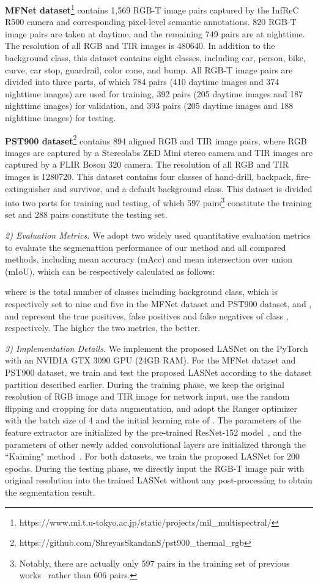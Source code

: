 \documentclass[journal]{IEEEtran}
\begin{document}
\textbf{MFNet dataset}\footnote{https://www.mi.t.u-tokyo.ac.jp/static/projects/mil\_multispectral/} contains 1,569 RGB-T image pairs captured by the InfReC R500 camera and corresponding pixel-level semantic annotations. 
820 RGB-T image pairs are taken at daytime, and the remaining 749 pairs are at nighttime.
The resolution of all RGB and TIR images is 480640.
In addition to the background class, this dataset contains eight classes, including car, person, bike, curve, car stop, guardrail, color cone, and bump.
All RGB-T image pairs are divided into three parts, of which 784 pairs (410 daytime images and 374 nighttime images) are used for training, 392 pairs (205 daytime images and 187 nighttime images) for validation, and 393 pairs (205 daytime images and 188 nighttime images) for testing.

\textbf{PST900 dataset}\footnote{https://github.com/ShreyasSkandanS/pst900\_thermal\_rgb} contains 894 aligned RGB and TIR image pairs, where RGB images are captured by a Stereolabs ZED Mini stereo camera and TIR images are captured by a FLIR Boson 320 camera.
The resolution of all RGB and TIR images is 1280720.
This dataset contains four classes of hand-drill, backpack, fire-extinguisher and survivor, and a default background class.
This dataset is divided into two parts for training and testing, of which 597 pairs\footnote{Notably, there are actually only 597 pairs in the training set of previous works~\cite{2020PSTNet,2022MFFENet,2022EGFNet,2022MTANet} rather than 606 pairs.} constitute the training set and 288 pairs constitute the testing set.


\textit{2) Evaluation Metrics.}
We adopt two widely used quantitative evaluation metrics to evaluate the segmenattion performance of our method and all compared methods, including mean accuracy (mAcc) and mean intersection over union (mIoU), which can be respectively calculated as follows:


where  is the total number of classes including background class, which is respectively set to nine and five in the MFNet dataset and PST900 dataset, and ,  and  represent the true positives, false positives and false negatives of class , respectively.
The higher the two metrics, the better.



\textit{3) Implementation Details.}
We implement the proposed LASNet on the PyTorch~\cite{PyTorch} with an NVIDIA GTX 3090 GPU (24GB RAM).
For the MFNet dataset and PST900 dataset, we train and test the proposed LASNet according to the dataset partition described earlier.
During the training phase, we keep the original resolution of RGB image and TIR image for network input, use the random flipping and cropping for data augmentation, and adopt the Ranger optimizer with the batch size of 4 and the initial learning rate of .
The parameters of the feature extractor are initialized by the pre-trained ResNet-152 model~\cite{2016ResNet}, and the parameters of other newly added convolutional layers are initialized through the ``Kaiming" method~\cite{InitialWei}.
For both datasets, we train the proposed LASNet for 200 epochs.
During the testing phase, we directly input the RGB-T image pair with original resolution into the trained LASNet without any post-processing to obtain the segmentation result.
\end{document}

